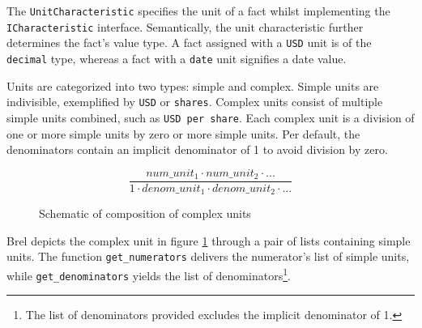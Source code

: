
The \texttt{UnitCharacteristic} specifies the unit of a fact whilst implementing the \texttt{ICharacteristic} interface.
Semantically, the unit characteristic further determines the fact's value type.
A fact assigned with a \texttt{USD} unit is of the \texttt{decimal} type, whereas a fact with a \texttt{date} unit signifies a date value.

Units are categorized into two types: simple and complex.
Simple units are indivisible, exemplified by \texttt{USD} or \texttt{shares}.
Complex units consist of multiple simple units combined, such as \texttt{USD per share}.
Each complex unit is a division of one or more simple units by zero or more simple units.
Per default, the denominators contain an implicit denominator of 1 to avoid division by zero.

\begin{figure}[H]
    \centering
    \caption{Schematic of composition of complex units}
    $$\frac{num\_unit_1 \cdot num\_unit_2 \cdot ...}{1 \cdot denom\_unit_1 \cdot denom\_unit_2 \cdot ...}$$
    \label{fig:complex_unit}
\end{figure}

Brel depicts the complex unit in figure \ref{fig:complex_unit} through a pair of lists containing simple units.
The function \texttt{get\_numerators} delivers the numerator's list of simple units, while \texttt{get\_denominators} yields the list of denominators\footnote{The list of denominators provided excludes the implicit denominator of 1.}.

